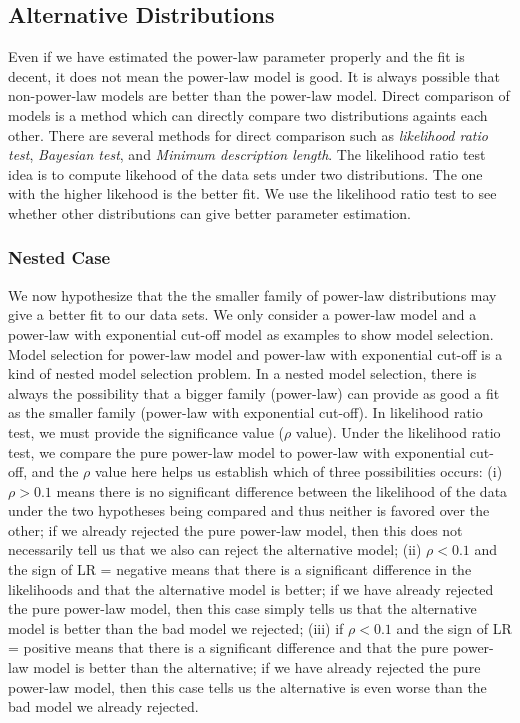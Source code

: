 \documentclass[paper]{ieice}
\begin{document}
\subsection{Alternative Distributions}
Even if we have estimated the power-law parameter properly and the fit is decent, it does not mean the power-law model is good.
It is always possible that non-power-law models are better than the power-law model.
Direct comparison of models is a method which can directly compare two distributions againts each other.
There are several methods for direct comparison such as \textit{likelihood ratio test}, \textit{Bayesian test}, and \textit{Minimum description length}.
The likelihood ratio test idea is to compute likehood of the data sets under two distributions. 
The one with the higher likehood is the better fit. 
We use the likelihood ratio test \cite{vuong1989likelihood} to see whether other distributions can give better parameter estimation.

\subsubsection{Nested Case}
We now hypothesize that the the smaller family of power-law distributions may give a better fit to our data sets.
We only consider a power-law model and a power-law with exponential cut-off model as examples to show model selection.
Model selection for power-law model and power-law with exponential cut-off is a kind of nested model selection problem.
In a nested model selection,  there is always the possibility that a bigger family (power-law) can provide as good a fit as the smaller family (power-law with exponential cut-off).
In likelihood ratio test, we must provide the significance value ($\rho$ value).
Under the likelihood ratio test, we compare the pure power-law model to power-law with exponential cut-off, and the $\rho$ value here helps us establish which of three possibilities occurs: (i) $\rho > 0.1$ means there is no significant difference between the likelihood of the data under the two hypotheses being compared and thus neither is favored over the other; if we already rejected the pure power-law model, then this does not necessarily tell us that we also can reject the alternative model; (ii) $\rho  < 0.1$ and the sign of LR = negative means that there is a significant difference in the likelihoods and that the alternative model is better; if we have already rejected the pure power-law model, then this case simply tells us that the alternative model is better than the bad model we rejected; (iii) if $\rho < 0.1$ and the sign of LR = positive means that there is a significant difference and that the pure power-law model is better than the alternative; if we have already rejected the pure power-law model, then this case tells us the alternative is even worse than the bad model we already rejected.
\end{document}
